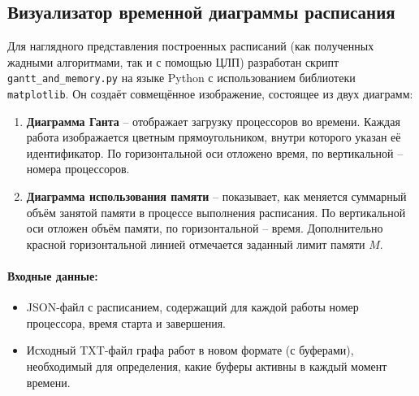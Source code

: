 \subsection{Визуализатор временной диаграммы расписания}\label{sec:visual}

Для наглядного представления построенных расписаний (как полученных жадными алгоритмами, так и с помощью ЦЛП) разработан скрипт \texttt{gantt\_and\_memory.py} на языке Python с использованием библиотеки \texttt{matplotlib}. Он создаёт совмещённое изображение, состоящее из двух диаграмм:

\begin{enumerate}
	\item \textbf{Диаграмма Ганта} – отображает загрузку процессоров во времени. Каждая работа изображается цветным прямоугольником, внутри которого указан её идентификатор. По горизонтальной оси отложено время, по вертикальной – номера процессоров.
	\item \textbf{Диаграмма использования памяти} – показывает, как меняется суммарный объём занятой памяти в процессе выполнения расписания. По вертикальной оси отложен объём памяти, по горизонтальной – время. Дополнительно красной горизонтальной линией отмечается заданный лимит памяти $M$.
\end{enumerate}

\paragraph{Входные данные:}
\begin{itemize}
	\item JSON-файл с расписанием, содержащий для каждой работы номер процессора, время старта и завершения.
	\item Исходный TXT-файл графа работ в новом формате (с буферами), необходимый для определения, какие буферы активны в каждый момент времени.
\end{itemize}

